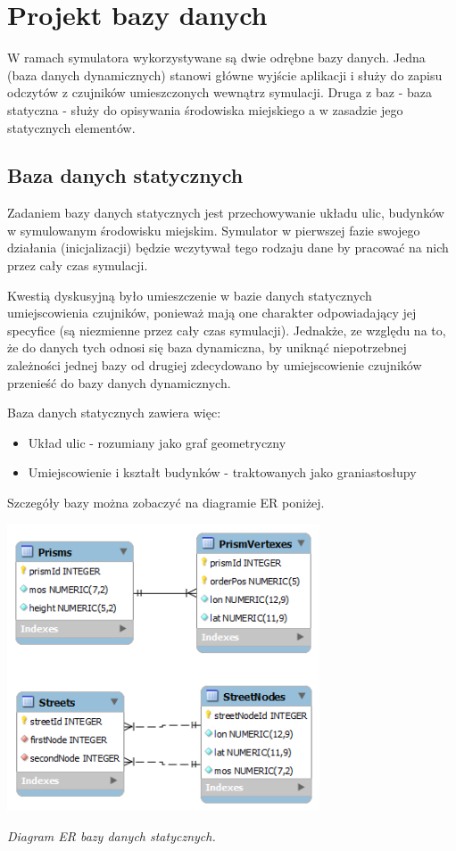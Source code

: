 {\section[Projekt bazy danych][Projekt bazy danych]{Projekt bazy danych}
\par{
W ramach symulatora wykorzystywane są dwie odrębne bazy danych. Jedna (baza danych dynamicznych) stanowi główne wyjście aplikacji i służy do zapisu odczytów z czujników umieszczonych wewnątrz symulacji. Druga z baz - baza statyczna - służy do opisywania środowiska miejskiego a w zasadzie jego statycznych elementów.
}

\subsection{Baza danych statycznych}
\par{
Zadaniem bazy danych statycznych jest przechowywanie układu ulic, budynków w symulowanym środowisku miejskim. Symulator w pierwszej fazie swojego działania (inicjalizacji) będzie wczytywał tego rodzaju dane by pracować na nich przez cały czas symulacji.
}
\par{
Kwestią dyskusyjną było umieszczenie w bazie danych statycznych umiejscowienia czujników, ponieważ mają one charakter odpowiadający jej specyfice (są niezmienne przez cały czas symulacji). Jednakże, ze względu na to, że do danych tych odnosi się baza dynamiczna, by uniknąć niepotrzebnej zależności jednej bazy od drugiej zdecydowano by umiejscowienie czujników przenieść do bazy danych dynamicznych.
}
\par{
Baza danych statycznych zawiera więc:
\begin{itemize}
\item Układ ulic - rozumiany jako graf geometryczny
\item Umiejscowienie i kształt budynków - traktowanych jako graniastosłupy
\end{itemize}
Szczegóły bazy można zobaczyć na diagramie ER poniżej.
}

\par{
\begin{center}
\includegraphics[width=25em]{img/static_db}
\end{center}
}
\par{
\begin{center}
\textit{Diagram ER bazy danych statycznych.}
\end{center}
}

}
